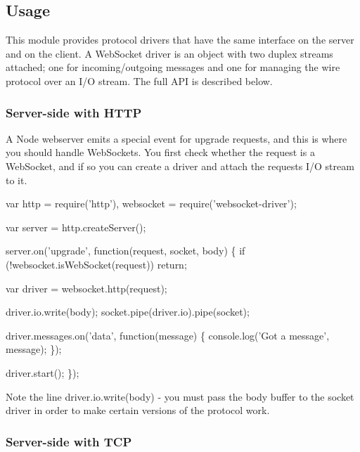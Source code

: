

\subsection*{Usage}

This module provides protocol drivers that have the same interface on the server and on the client. A Web\+Socket driver is an object with two duplex streams attached; one for incoming/outgoing messages and one for managing the wire protocol over an I/O stream. The full A\+PI is described below.

\subsubsection*{Server-\/side with H\+T\+TP}

A Node webserver emits a special event for \textquotesingle{}upgrade\textquotesingle{} requests, and this is where you should handle Web\+Sockets. You first check whether the request is a Web\+Socket, and if so you can create a driver and attach the request\textquotesingle{}s I/O stream to it.


\begin{DoxyCode}
var http = require('http'),
    websocket = require('websocket-driver');

var server = http.createServer();

server.on('upgrade', function(request, socket, body) \{
  if (!websocket.isWebSocket(request)) return;

  var driver = websocket.http(request);

  driver.io.write(body);
  socket.pipe(driver.io).pipe(socket);

  driver.messages.on('data', function(message) \{
    console.log('Got a message', message);
  \});

  driver.start();
\});
\end{DoxyCode}


Note the line {\ttfamily driver.\+io.\+write(body)} -\/ you must pass the {\ttfamily body} buffer to the socket driver in order to make certain versions of the protocol work.

\subsubsection*{Server-\/side with T\+CP}


